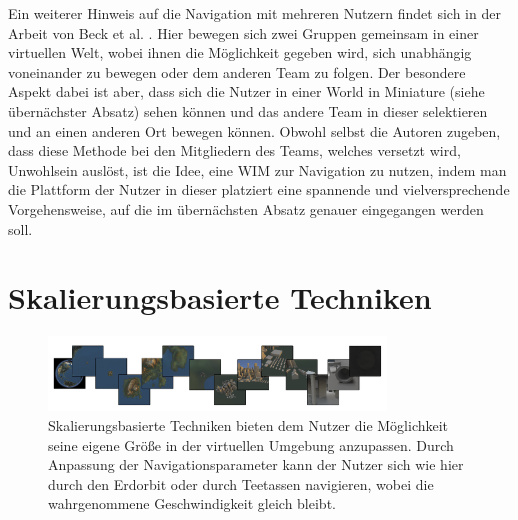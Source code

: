 Ein weiterer Hinweis auf die Navigation mit mehreren Nutzern findet sich in der Arbeit von Beck et al. \cite{BeckImmersiveTelepresence}. Hier bewegen sich zwei Gruppen gemeinsam in einer virtuellen Welt, wobei ihnen die Möglichkeit gegeben wird, sich unabhängig voneinander zu bewegen oder dem anderen Team zu folgen. Der besondere Aspekt dabei ist aber, dass sich die Nutzer in einer World in Miniature (siehe übernächster Absatz) sehen können und das andere Team in dieser selektieren und an einen anderen Ort bewegen können. Obwohl selbst die Autoren zugeben, dass diese Methode bei den Mitgliedern des Teams, welches versetzt wird, Unwohlsein auslöst, ist die Idee, eine WIM zur Navigation zu nutzen, indem man die Plattform der Nutzer in dieser platziert eine spannende und vielversprechende Vorgehensweise, auf die im übernächsten Absatz genauer eingegangen werden soll. 



\section{Skalierungsbasierte Techniken}

\begin{figure}[h]
  \centering
  \includegraphics[width=0.8\textwidth]{images/skalierung.png}
  \caption{Skalierungsbasierte Techniken bieten dem Nutzer die Möglichkeit seine eigene Größe in der virtuellen Umgebung anzupassen. Durch Anpassung der Navigationsparameter kann der Nutzer sich wie hier durch den Erdorbit oder durch Teetassen navigieren, wobei die wahrgenommene Geschwindigkeit gleich bleibt. \cite{McCrae2009MultiscaleNavigation}}
  \label{fig:todo}
\end{figure}

